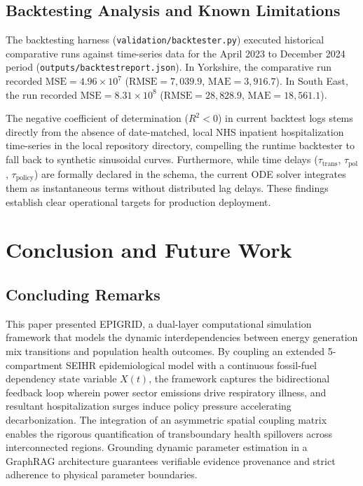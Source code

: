 \documentclass[conference]{IEEEtran}
\renewcommand{\_}{\textunderscore\allowbreak{}}%
\begin{document}
\subsection{Backtesting Analysis and Known Limitations}
The backtesting harness (\texttt{validation/backtester.py}) executed historical comparative runs against time-series data for the April 2023 to December 2024 period (\texttt{outputs/backtest\_report.json}). In Yorkshire, the comparative run recorded $\text{MSE} = 4.96\times 10^7$ ($\text{RMSE} = 7,039.9$, $\text{MAE} = 3,916.7$). In South East, the run recorded $\text{MSE} = 8.31\times 10^8$ ($\text{RMSE} = 28,828.9$, $\text{MAE} = 18,561.1$).

The negative coefficient of determination ($R^2 < 0$) in current backtest logs stems directly from the absence of date-matched, local NHS inpatient hospitalization time-series in the local repository directory, compelling the runtime backtester to fall back to synthetic sinusoidal curves. Furthermore, while time delays ($\tau_{\text{trans}}$, $\tau_{\text{pol}}$, $\tau_{\text{policy}}$) are formally declared in the schema, the current ODE solver integrates them as instantaneous terms without distributed lag delays. These findings establish clear operational targets for production deployment.

\section{Conclusion and Future Work}

\subsection{Concluding Remarks}
This paper presented EPIGRID, a dual-layer computational simulation framework that models the dynamic interdependencies between energy generation mix transitions and population health outcomes. By coupling an extended 5-compartment SEIHR epidemiological model with a continuous fossil-fuel dependency state variable $X(t)$, the framework captures the bidirectional feedback loop wherein power sector emissions drive respiratory illness, and resultant hospitalization surges induce policy pressure accelerating decarbonization. The integration of an asymmetric spatial coupling matrix enables the rigorous quantification of transboundary health spillovers across interconnected regions. Grounding dynamic parameter estimation in a GraphRAG architecture guarantees verifiable evidence provenance and strict adherence to physical parameter boundaries.
\end{document}
